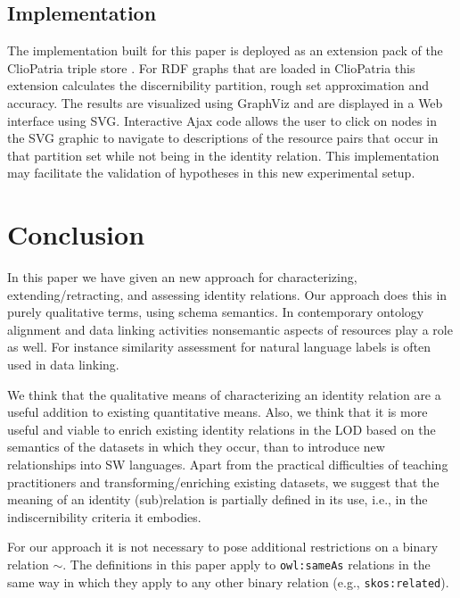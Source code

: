 \documentclass[letterpaper]{article}
\begin{document}
\subsection{Implementation}
\label{sec:implementation}

The implementation built for this paper is deployed as an extension pack
  of the ClioPatria triple store \cite{schreiber_2006}.
For RDF graphs that are loaded in ClioPatria this extension calculates
  the discernibility partition, rough set approximation and accuracy.
The results are visualized using GraphViz and are displayed in a
  Web interface using SVG.
Interactive Ajax code allows the user to click on nodes in the SVG graphic
  to navigate to descriptions of the resource pairs that occur in
  that partition set while not being in the identity relation.
This implementation may facilitate the validation of hypotheses in this
  new experimental setup.

\section{Conclusion}
\label{sec:conclusion}

In this paper we have given an new approach for characterizing,
  extending/retracting, and assessing identity relations.
Our approach does this in purely qualitative terms, using schema semantics.
In contemporary ontology alignment and data linking activities nonsemantic
  aspects of resources play a role as well.
For instance similarity assessment for natural language labels is often
  used in data linking.

We think that the qualitative means of characterizing an identity relation
  are a useful addition to existing quantitative means.
Also, we think that it is more useful and viable to enrich existing
  identity relations in the LOD based on the semantics of the datasets
  in which they occur, than to introduce new relationships into SW languages.
Apart from the practical difficulties of teaching practitioners
  and transforming/enriching existing datasets, we suggest that the
  meaning of an identity (sub)relation is partially defined in its use,
  i.e., in the indiscernibility criteria it embodies.

For our approach it is not necessary to pose additional restrictions
  on a binary relation $\sim$.
The definitions in this paper apply to \verb|owl:sameAs| relations
  in the same way in which they apply to any other binary relation
  (e.g., \verb|skos:related|).
\end{document}

